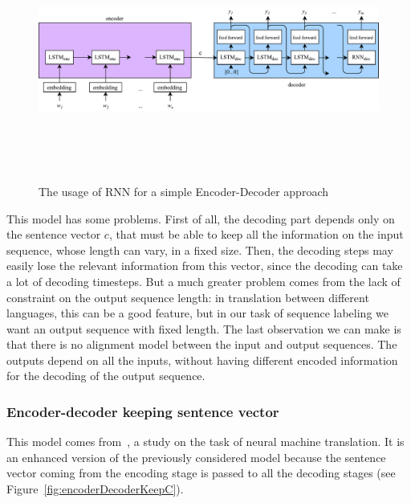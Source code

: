 \begin{figure}[!htb]
    \centering
    \includegraphics[max width=0.8\linewidth,max height=8cm,keepaspectratio]{figures/encoderDecoderRNN}
    \caption{The usage of RNN for a simple Encoder-Decoder approach}\label{fig:encoderDecoderRNN}
\end{figure}

This model has some problems. First of all, the decoding part depends only on the sentence vector $c$, that must be able to keep all the information on the input sequence, whose length can vary, in a fixed size. Then, the decoding steps may easily lose the relevant information from this vector, since the decoding can take a lot of decoding timesteps. But a much greater problem comes from the lack of constraint on the output sequence length: in translation between different languages, this can be a good feature, but in our task of sequence labeling we want an output sequence with fixed length. The last observation we can make is that there is no alignment model between the input and output sequences. The outputs depend on all the inputs, without having different encoded information for the decoding of the output sequence.

\subsubsection{Encoder-decoder keeping sentence vector}
This model comes from~\cite{cho2014learning}, a study on the task of neural machine translation. It is an enhanced version of the previously considered model because the sentence vector coming from the encoding stage is passed to all the decoding stages (see Figure~\ref{fig:encoderDecoderKeepC}).

